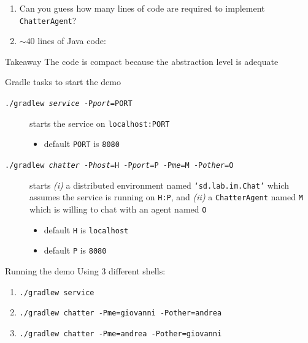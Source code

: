 \documentclass[presentation]{beamer}\mode<presentation>{\usetheme{AMSCesenaPurpleAndGold}}
\begin{document}
\begin{frame}[allowframebreaks]
\begin{enumerate}
		\framebreak

		\item Can you guess how many lines of code are required to implement \texttt{ChatterAgent}?
		
		\framebreak

		\item $\sim40$ lines of Java code:
		
	\end{enumerate}

	\begin{alertblock}{Takeaway}\centering
		The code is compact because the abstraction level is adequate
	\end{alertblock}

	\framebreak

	\begin{block}{Gradle tasks to start the demo}
		\begin{description}
			\item[\texttt{./gradlew \textit{service} -P\textit{port}=PORT}] 
			starts the \linda{} service on \texttt{localhost:PORT}  
			\begin{itemize}
				\item default \texttt{PORT} is \texttt{8080}
			\end{itemize}

			\item[\texttt{./gradlew \textit{chatter} -P\textit{host}=H -P\textit{port}=P -P\textit{me}=M -P\textit{other}=O}]
			starts \emph{(i)} a distributed environment named \texttt{`sd.lab.im.Chat'} which assumes the \linda{} service is running on \texttt{H:P}, and \emph{(ii)} a \texttt{ChatterAgent} named \texttt{M} which is willing to chat with an agent named \texttt{O}
			\begin{itemize}
				\item default \texttt{H} is \texttt{localhost}
				\item default \texttt{P} is \texttt{8080}
			\end{itemize}
		\end{description}
	\end{block}

	\begin{exampleblock}{Running the demo}
		Using \alert{3 different shells}:
		\begin{enumerate}
			\item \texttt{./gradlew service} 
			\item \texttt{./gradlew chatter -Pme=giovanni -Pother=andrea} 
			\item \texttt{./gradlew chatter -Pme=andrea -Pother=giovanni} 
		\end{enumerate}
	\end{exampleblock}
\end{frame}
\end{document}
